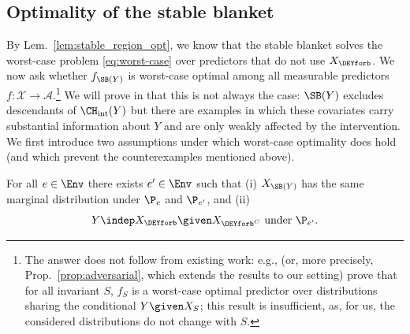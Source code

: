 
\subsection{Optimality of the stable blanket} \label{sec:worst_case}

By Lem.~\ref{lem:stable_region_opt}, we know that the stable blanket solves the worst-case problem \eqref{eq:worst-case} over predictors that do not use $X_{\DEYforb}$. We now ask %
whether $f_{\SB(Y)}$ is worst-case optimal among all measurable predictors $f\colon \mathcal{X} \to \mathcal{A}$.\footnote{
The answer does not follow from existing work:  e.g., 
\citet[][Thm.~4]{rojas-carullaInvariantModelsCausal2018} (or, more precisely, Prop.~\ref{prop:adversarial}, which extends the results to our setting)
prove that 
for all invariant $S$, $f_S$ is a worst-case optimal predictor over distributions sharing the conditional $Y \given X_S$; this result is insufficient, as, for us, the considered distributions do not change with $S$.
}
%
We will prove in 
that
this is not always the case: $\SB(Y)$
excludes descendants of $\CH_\mathrm{int}(Y)$ but there are examples in which these covariates
carry substantial information about $Y$
and are only weakly affected by the intervention.
We first introduce two assumptions under which worst-case optimality %
does hold (and which prevent the counterexamples mentioned above).
\begin{assumption} \label{as:A1}
    For all $e \in \Env$ there exists $e' \in \Env$ such that (i) 
 $X_{\SB(Y)}$ has the same marginal distribution under $\P_e$ and $\P_{e'}$, and (ii)
        $$
        Y \indep X_{\DEYforb} \given X_{\DEYforb^C} \text{ under } \P_{e'}.$$
\end{assumption}
